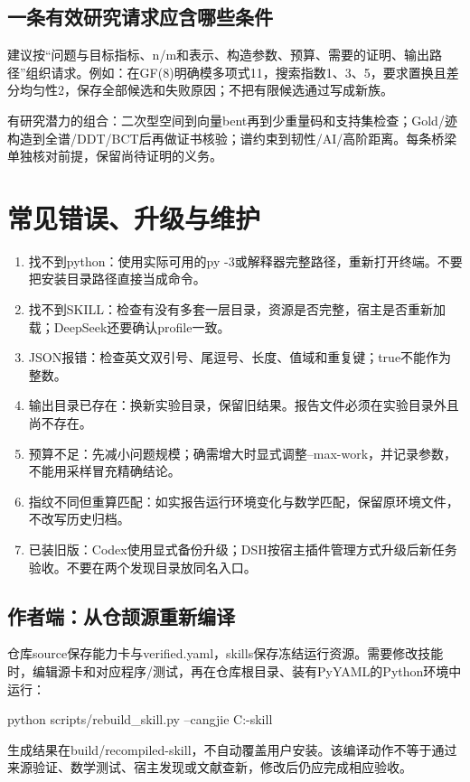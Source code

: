 \documentclass[UTF8,fontset=fandol,zihao=-4]{ctexrep}
\begin{document}
\section{一条有效研究请求应含哪些条件}
建议按“问题与目标指标、n/m和表示、构造参数、预算、需要的证明、输出路径”组织请求。例如：在GF(8)明确模多项式11，搜索指数1、3、5，要求置换且差分均匀性2，保存全部候选和失败原因；不把有限候选通过写成新族。

有研究潜力的组合：二次型空间到向量bent再到少重量码和支持集检查；Gold/迹构造到全谱/DDT/BCT后再做证书核验；谱约束到韧性/AI/高阶距离。每条桥梁单独核对前提，保留尚待证明的义务。

\chapter{常见错误、升级与维护}
\begin{enumerate}
\item 找不到python：使用实际可用的py -3或解释器完整路径，重新打开终端。不要把安装目录路径直接当成命令。
\item 找不到SKILL：检查有没有多套一层目录，资源是否完整，宿主是否重新加载；DeepSeek还要确认profile一致。
\item JSON报错：检查英文双引号、尾逗号、长度、值域和重复键；true不能作为整数。
\item 输出目录已存在：换新实验目录，保留旧结果。报告文件必须在实验目录外且尚不存在。
\item 预算不足：先减小问题规模；确需增大时显式调整--max-work，并记录参数，不能用采样冒充精确结论。
\item 指纹不同但重算匹配：如实报告运行环境变化与数学匹配，保留原环境文件，不改写历史归档。
\item 已装旧版：Codex使用显式备份升级；DSH按宿主插件管理方式升级后新任务验收。不要在两个发现目录放同名入口。
\end{enumerate}

\section{作者端：从仓颉源重新编译}
仓库source保存能力卡与verified.yaml，skills保存冻结运行资源。需要修改技能时，编辑源卡和对应程序/测试，再在仓库根目录、装有PyYAML的Python环境中运行：
\begin{code}
python scripts/rebuild_skill.py --cangjie C:\path\to\cangjie-skill
\end{code}
生成结果在build/recompiled-skill，不自动覆盖用户安装。该编译动作不等于通过来源验证、数学测试、宿主发现或文献查新，修改后仍应完成相应验收。
\end{document}
